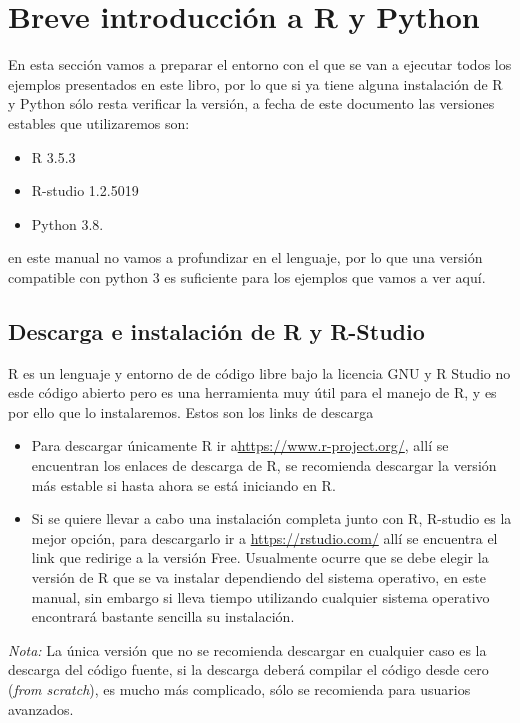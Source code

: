 \documentclass[12pt,hidelinks]{article}
\begin{document}
	\section{Breve introducción a R y Python}
	\vspace{10.5cm}
	En esta sección vamos a preparar el entorno con el que se van a ejecutar todos los ejemplos presentados en este libro, por lo que si ya tiene alguna instalación de R y Python sólo resta verificar la versión, a fecha de este documento las versiones estables que utilizaremos son:
	\begin{itemize}
		\item R 3.5.3
		\item R-studio 1.2.5019
		\item Python 3.8.
	\end{itemize}
	en este manual no vamos a profundizar en el lenguaje, por lo que una versión compatible con python 3 es suficiente para los ejemplos que vamos a ver aquí.
	\subsection{Descarga e instalación de R y R-Studio}
	R es un lenguaje y entorno de de código libre bajo la licencia GNU y R Studio no esde código abierto pero es una herramienta muy útil para el manejo de R, y es por ello que lo instalaremos. Estos son los links de descarga
	\begin{itemize}
		\item Para descargar únicamente R ir a\url{https://www.r-project.org/}, allí se encuentran los enlaces de descarga de R, se recomienda descargar la versión más estable si hasta ahora se está iniciando en R.
		\item Si se quiere llevar a cabo una instalación completa junto con R, R-studio es la mejor opción, para descargarlo ir a \url{https://rstudio.com/} allí se encuentra el link que redirige a la versión Free. Usualmente ocurre que se debe elegir la versión de R que se va instalar dependiendo del sistema operativo, en este manual, sin embargo si lleva tiempo utilizando cualquier sistema operativo encontrará bastante sencilla su instalación.
	\end{itemize}
	\textit{Nota:} La única versión que no se recomienda descargar en cualquier caso es la descarga del código fuente, si la descarga deberá compilar el código desde cero (\textit{from scratch}), es mucho más complicado, sólo se recomienda para usuarios avanzados.	
\end{document}
